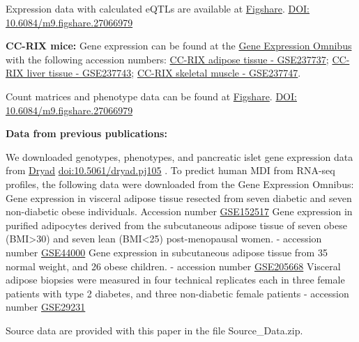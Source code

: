 \documentclass[
]{article}
\begin{document}
Expression data with calculated eQTLs are available at
\href{https://figshare.com/}{Figshare}.
\href{https://figshare.com/articles/dataset/Data_and_code_for_High-Dimensional_Mediation_Analysis_HDMA_in_diversity_outbred_mice/27066979}{DOI:
10.6084/m9.figshare.27066979} \cite{cube_data}

\textbf{CC-RIX mice:} Gene expression can be found at the
\href{https://www.ncbi.nlm.nih.gov/geo/}{Gene Expression Omnibus} with
the following accession numbers:
\href{https://www.ncbi.nlm.nih.gov/geo/query/acc.cgi?acc=GSE237737}{CC-RIX
adipose tissue - GSE237737};
\href{https://www.ncbi.nlm.nih.gov/geo/query/acc.cgi?acc=GSE237743}{CC-RIX
liver tissue - GSE237743};
\href{https://www.ncbi.nlm.nih.gov/geo/query/acc.cgi?acc=GSE237747}{CC-RIX
skeletal muscle - GSE237747}.

Count matrices and phenotype data can be found at
\href{https://figshare.com/}{Figshare}.
\href{https://figshare.com/articles/dataset/Data_and_code_for_High-Dimensional_Mediation_Analysis_HDMA_in_diversity_outbred_mice/27066979}{DOI:
10.6084/m9.figshare.27066979} \cite{cube_data}

\textbf{Data from previous publications:}

We downloaded genotypes, phenotypes, and pancreatic islet gene
expression data from \href{https://datadryad.org/}{Dryad}
\href{https://datadryad.org/dataset/doi:10.5061/dryad.pj105}{doi:10.5061/dryad.pj105}
\cite{DO_data}. To predict human MDI from RNA-seq profiles, the
following data were downloaded from the Gene Expression Omnibus: Gene
expression in visceral adipose tissue resected from seven diabetic and
seven non-diabetic obese individuals. Accession number
\href{https://www.ncbi.nlm.nih.gov/geo/query/acc.cgi?acc=GSE152517}{GSE152517}
Gene expression in purified adipocytes derived from the subcutaneous
adipose tissue of seven obese (BMI\textgreater30) and seven lean
(BMI\textless25) post-menopausal women. - accession number
\href{https://www.ncbi.nlm.nih.gov/geo/query/acc.cgi?acc=GSE44000}{GSE44000}
Gene expression in subcutaneous adipose tissue from 35 normal weight,
and 26 obese children. - accession number
\href{https://www.ncbi.nlm.nih.gov/geo/query/acc.cgi?acc=GSE205668}{GSE205668}
Visceral adipose biopsies were measured in four technical replicates
each in three female patients with type 2 diabetes, and three
non-diabetic female patients - accession number
\href{https://www.ncbi.nlm.nih.gov/geo/query/acc.cgi?acc=GSE29231}{GSE29231}

Source data are provided with this paper in the file Source\_Data.zip.
\end{document}
